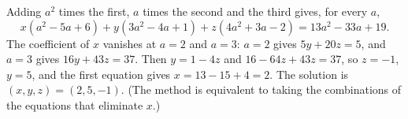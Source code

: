 Adding $a^2$ times the first, $a$ times the second and the third gives, for every $a$,
\[x(a^2-5a+6)+y(3a^2-4a+1)+z(4a^2+3a-2)=13a^2-33a+19.\]
The coefficient of $x$ vanishes at $a=2$ and $a=3$: $a=2$ gives $5y+20z=5$, and $a=3$ gives $16y+43z=37$. Then $y=1-4z$ and $16-64z+43z=37$, so $z=-1$, $y=5$, and the first equation gives $x=13-15+4=2$. The solution is $\boxed{(x,y,z)=(2,5,-1)}$. (The method is equivalent to taking the combinations of the equations that eliminate $x$.)
